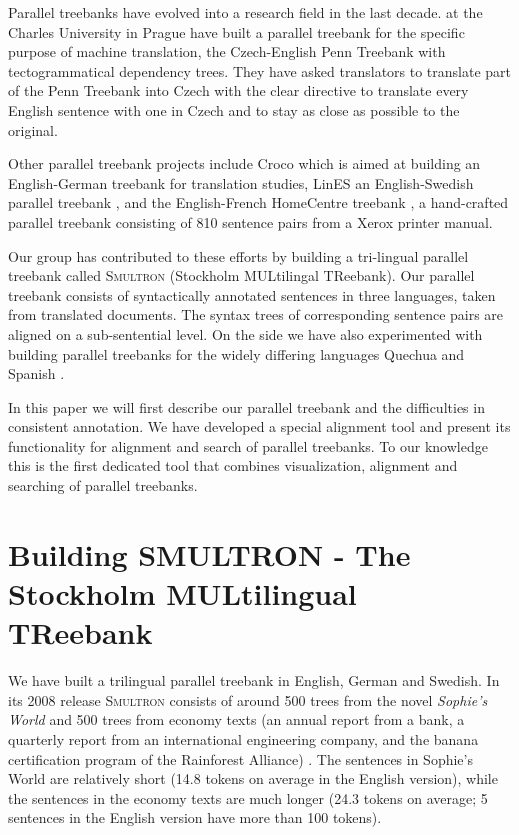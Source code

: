\documentclass[output=paper]{LSP/langsci}
\begin{document}
Parallel treebanks have evolved into a research field in the last decade. \citet{CmejrekEtAl2003} at the Charles University in Prague have built a parallel treebank for the specific purpose of machine translation, the Czech-English Penn Treebank with tectogrammatical dependency trees. They have asked translators to translate part of the Penn Treebank into Czech with the clear directive to translate every English sentence with one in Czech and to stay as close as possible to the original. 

Other parallel treebank projects include Croco \citep{Hansen-SchirraEtAl2006} which is aimed at building an English-German treebank for translation studies, LinES an English-Swedish parallel treebank \citep{Ahrenberg2007}, and the English-French HomeCentre treebank \citep{Hearne2006}, a hand-crafted parallel treebank consisting of 810 sentence pairs from a Xerox printer manual. 

Our group has contributed to these efforts by building a tri-lingual parallel treebank called S\textsc{multron} (Stockholm MULtilingal TReebank). Our parallel treebank consists of syntactically annotated sentences in three languages, taken from translated documents. The syntax trees of corresponding sentence pairs are aligned on a sub-sentential level. On the side we have also experimented with building parallel treebanks for the widely differing languages Quechua and Spanish \citep{RiosEtAl2009}. 

In this paper we will first describe our parallel treebank and the difficulties in consistent annotation. We have developed a special alignment tool and present its functionality for alignment and search of parallel treebanks. To our knowledge this is the first dedicated tool that combines visualization, alignment and searching of parallel treebanks. 

\section{Building SMULTRON - The Stockholm MULtilingual TReebank}\label{sec:volk:2}

We have built a trilingual parallel treebank in English, German and Swedish. In its 2008 release S\textsc{multron} consists of around 500 trees from the novel \textit{Sophie's World} and 500 trees from economy texts (an annual report from a bank, a quarterly report from an international engineering company, and the banana certification program of the Rainforest Alliance) \citep{Samuelsson2006, Samuelsson2007}. The sentences in Sophie's World are relatively short (14.8 tokens on average in the English version), while the sentences in the economy texts are much longer (24.3 tokens on average; 5 sentences in the English version have more than 100 tokens). 
\end{document}
